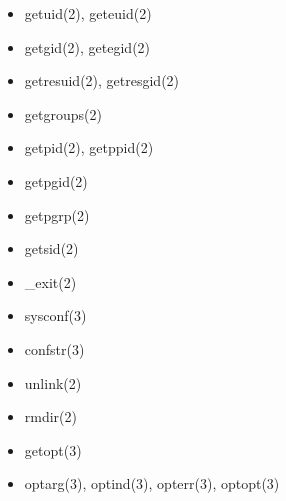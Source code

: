 \documentclass{article}
\begin{document}
\begin{itemize}
\begin{itemize}
\begin{itemize}
                    \item getuid(2), geteuid(2)
                    \item getgid(2), getegid(2)
                    \item getresuid(2), getresgid(2)
                    \item getgroups(2)
                    \item getpid(2), getppid(2)
                    \item getpgid(2)
                    \item getpgrp(2)
                    \item getsid(2)

                    \item _exit(2)

                    \item sysconf(3)
                    \item confstr(3)

                    \item unlink(2)
                    \item rmdir(2)

                    \item getopt(3)
                    \item optarg(3), optind(3), opterr(3), optopt(3)


\end{itemize}
\end{itemize}
\end{itemize}
\end{document}
